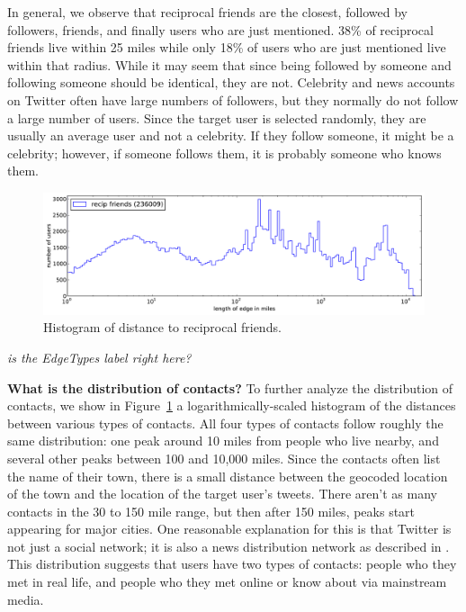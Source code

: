 \documentclass{sig-alternate}
\newcommand{\jam}[1]{\emph{#1}}
\begin{document}
In general, we observe that reciprocal friends are the closest, followed by followers, friends,
and finally users who are just mentioned.
%
38\% of reciprocal friends live within 25 miles while only 18\% of users
who are just mentioned live within that radius.
%
While it may seem that since being followed by someone and following someone
should be identical, they are not.
%
Celebrity and news accounts on Twitter often have large numbers of followers,
but they normally do not follow a large number of users.
%
Since the target user is selected randomly, they are usually an average
user and not a celebrity.
%
If they follow someone, it might be a celebrity; however, if someone follows
them, it is probably someone who knows them.

\begin{figure}[tb]
\centering
\includegraphics[width=.9\linewidth]{figures/rfrd_norm.pdf}
\caption{
Histogram of distance to reciprocal friends.
}
\label{fig:EdgeTypes}
\vspace{-2pt}
\end{figure}
\jam{is the EdgeTypes label right here?}


\noindent\textbf{What is the distribution of contacts?}
To further analyze the distribution of contacts, we show in
Figure~\ref{fig:EdgeTypes} a logarithmically-scaled
histogram of the distances between various types of contacts.
%
All four types of contacts follow roughly the same
distribution: one peak around 10 miles from people who live nearby, and several
other peaks between 100 and 10,000 miles.
%
Since the contacts often list the name of their town, there is a small distance
between the geocoded location of the town and the location of the target
user's tweets.
%
There aren't as many contacts in the 30 to 150 mile range, but then after 150
miles, peaks start appearing for major cities.
%
One reasonable explanation for this is that Twitter is not just a social
network; it is also a news distribution network as described in
\cite{kwak2010why}.
%
This distribution suggests that users have two types of contacts: people who
they met in real life, and people who they met online or know about via
mainstream media.
\end{document}
